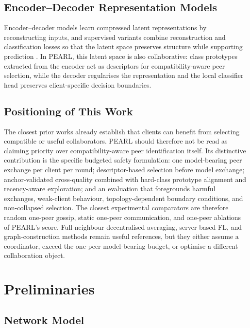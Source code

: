 \documentclass[conference]{IEEEtran}
\begin{document}
\subsection{Encoder--Decoder Representation Models}
\label{subsec:encoder-decoder-representation-models}
Encoder--decoder models learn compressed latent representations by reconstructing inputs, and supervised variants combine reconstruction and classification losses so that the latent space preserves structure while supporting prediction \cite{le2018supervised,chen2023auto,gille2022semi}. In PEARL, this latent space is also collaborative: class prototypes extracted from the encoder act as descriptors for compatibility-aware peer selection, while the decoder regularises the representation and the local classifier head preserves client-specific decision boundaries.

\subsection{Positioning of This Work}
\label{subsec:positioning-of-this-work}

The closest prior works already establish that clients can benefit from selecting compatible or useful collaborators. PEARL should therefore not be read as claiming priority over compatibility-aware peer identification itself. Its distinctive contribution is the specific budgeted safety formulation: one model-bearing peer exchange per client per round; descriptor-based selection before model exchange; anchor-validated cross-quality combined with hard-class prototype alignment and recency-aware exploration; and an evaluation that foregrounds harmful exchanges, weak-client behaviour, topology-dependent boundary conditions, and non-collapsed selection. The closest experimental comparators are therefore random one-peer gossip, static one-peer communication, and one-peer ablations of PEARL's score. Full-neighbour decentralised averaging, server-based FL, and graph-construction methods remain useful references, but they either assume a coordinator, exceed the one-peer model-bearing budget, or optimise a different collaboration object.

\section{Preliminaries}
\label{sec:preliminaries}

\subsection{Network Model}
\label{subsec:network-model}
\end{document}
